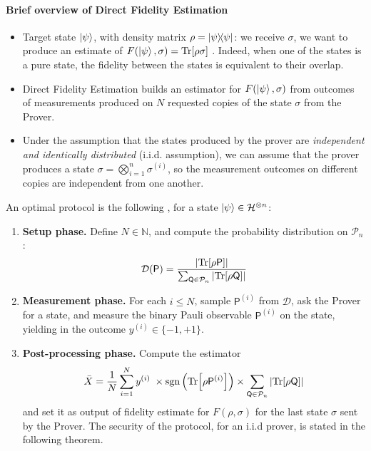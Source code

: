 \documentclass[11pt]{article}
\newcommand{\concept}[1]{\textcolor{importantclr}{\textsf{\textbf{#1}}}}
\renewcommand{\P}{\mathsf{P}}
\newcommand{\Q}{\mathsf{Q}}
\newcommand{\Pauli}{\mathcal{P}}
\begin{document}
\paragraph{Brief overview of Direct Fidelity Estimation}
\begin{itemize}
    \item Target state $\ket\psi$, with density matrix $\rho =\ketbra \psi$: we receive $\sigma$, we want to produce an estimate of $F(\ket\psi, \sigma) = \Tr[\rho\sigma]$ . Indeed, when one of the states is a pure state, the fidelity between the states is equivalent to their overlap.
    \item Direct Fidelity Estimation builds an estimator for $F(\ket\psi, \sigma)$ from outcomes of measurements produced on $N$ requested copies of the state $\sigma$ from the Prover.
    \item 
    Under the assumption that the states produced by the prover are \emph{independent and identically distributed} (i.i.d. assumption), we can assume that the prover produces a state $\sigma = \bigotimes_{i=1}^n \sigma^{(i)}$, so the measurement outcomes on different copies are independent from one another.
    \end{itemize}
    An optimal protocol is the following \cite{FOS24optimal}, for a state $\ket\psi \in \mathcal H^{\otimes n}$:
    \begin{enumerate}
        \item \concept{Setup phase.} Define $N\in \mathbb N$, and compute the probability distribution on $\Pauli_n$:
        \begin{equation}
            \mathcal D(\P) = \dfrac{\abs{\Tr[\rho\P]}}{\sum_{\Q\in\Pauli_n}\abs{\Tr[\rho\Q]}}
        \end{equation}
        \item \concept{Measurement phase.} For each $i\leq N$, sample $\P^{(i)}$ from $\mathcal D$, ask the Prover for a state, and measure the binary Pauli observable $\P^{(i)}$ on the state, yielding in the outcome $y^{(i)}\in\{-1, +1\}$.
        \item \concept{Post-processing phase.} Compute the estimator 
        \begin{equation}
            \bar X = \dfrac{1}{N} \sum_{i=1}^N
            y^{(i)}
            \;
            \times
            \mathrm{sgn}\left( 
                \Tr[\rho\P^{(i)}]
             \right)
             \times
             \sum_{\Q\in\Pauli_n}\abs{\Tr[\rho\Q]}
        \end{equation}
        and set it as output of fidelity estimate for $F(\rho, \sigma)$ for the last state $\sigma$ sent by the Prover.
        The security of the protocol, for an i.i.d prover, is stated in the following theorem.
    \end{enumerate}
\end{document}
